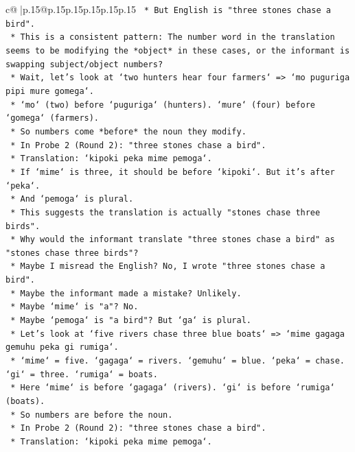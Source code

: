 \documentclass{article}
\begin{document}
{\begin{supertabular}{c@{$\;$}|p{.15\linewidth}@{}p{.15\linewidth}p{.15\linewidth}p{.15\linewidth}p{.15\linewidth}p{.15\linewidth}}
{{{\texttt{        *   But English is "three stones chase a bird".} \\
\texttt{        *   This is a consistent pattern: The number word in the translation seems to be modifying the *object* in these cases, or the informant is swapping subject/object numbers?} \\
\texttt{        *   Wait, let's look at `two hunters hear four farmers` => `mo puguriga pipi mure gomega`.} \\
\texttt{        *   `mo` (two) before `puguriga` (hunters). `mure` (four) before `gomega` (farmers).} \\
\texttt{        *   So numbers come *before* the noun they modify.} \\
\texttt{        *   In Probe 2 (Round 2): "three stones chase a bird".} \\
\texttt{        *   Translation: `kipoki peka mime pemoga`.} \\
\texttt{        *   If `mime` is three, it should be before `kipoki`. But it's after `peka`.} \\
\texttt{        *   And `pemoga` is plural.} \\
\texttt{        *   This suggests the translation is actually "stones chase three birds".} \\
\texttt{        *   Why would the informant translate "three stones chase a bird" as "stones chase three birds"?} \\
\texttt{        *   Maybe I misread the English? No, I wrote "three stones chase a bird".} \\
\texttt{        *   Maybe the informant made a mistake? Unlikely.} \\
\texttt{        *   Maybe `mime` is "a"? No.} \\
\texttt{        *   Maybe `pemoga` is "a bird"? But `ga` is plural.} \\
\texttt{        *   Let's look at `five rivers chase three blue boats` => `mime gagaga gemuhu peka gi rumiga`.} \\
\texttt{        *   `mime` = five. `gagaga` = rivers. `gemuhu` = blue. `peka` = chase. `gi` = three. `rumiga` = boats.} \\
\texttt{        *   Here `mime` is before `gagaga` (rivers). `gi` is before `rumiga` (boats).} \\
\texttt{        *   So numbers are before the noun.} \\
\texttt{        *   In Probe 2 (Round 2): "three stones chase a bird".} \\
\texttt{        *   Translation: `kipoki peka mime pemoga`.} \\
}}}
\end{supertabular}}
\end{document}
